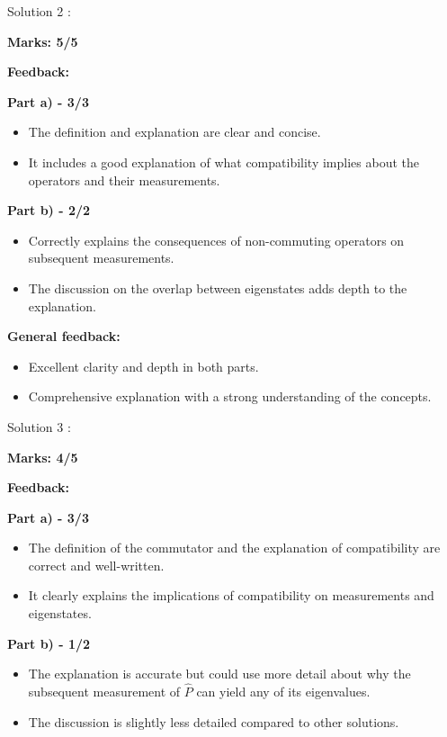 \documentclass[a4paper,11pt]{article}
\begin{document}
Solution 2 :

\textbf{Marks: 5/5}

\textbf{Feedback:}

\textbf{Part a) - 3/3}

\begin{itemize}
    \item The definition and explanation are clear and concise.
    \item It includes a good explanation of what compatibility implies about the operators and their measurements.
\end{itemize}

\textbf{Part b) - 2/2}

\begin{itemize}
    \item Correctly explains the consequences of non-commuting operators on subsequent measurements.
    \item The discussion on the overlap between eigenstates adds depth to the explanation.
\end{itemize}

\textbf{General feedback:}

\begin{itemize}
    \item Excellent clarity and depth in both parts.
    \item Comprehensive explanation with a strong understanding of the concepts.
\end{itemize}


Solution 3 :

\textbf{Marks: 4/5}

\textbf{Feedback:}

\textbf{Part a) - 3/3}

\begin{itemize}
    \item The definition of the commutator and the explanation of compatibility are correct and well-written.
    \item It clearly explains the implications of compatibility on measurements and eigenstates.
\end{itemize}

\textbf{Part b) - 1/2}

\begin{itemize}
    \item The explanation is accurate but could use more detail about why the subsequent measurement of $\hat{P}$ can yield any of its eigenvalues.
    \item The discussion is slightly less detailed compared to other solutions.
\end{itemize}
\end{document}
